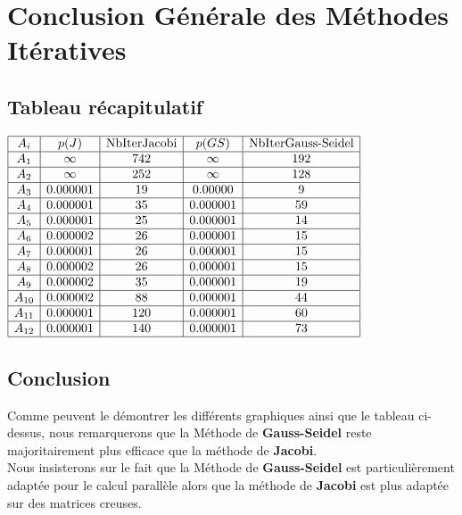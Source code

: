 \documentclass{report}
\begin{document}
\section{Conclusion Générale des Méthodes Itératives}
\subsection{Tableau récapitulatif}
$
\begin{array}{|c|c|c|c|c|}
\hline
A_i & p(J) & \text{NbIterJacobi} & p(GS) & \text{NbIterGauss-Seidel} \\
\hline
A_1 & \infty & 742 & \infty & 192\\
\hline
A_2 & \infty & 252 & \infty & 128 \\
\hline
A_3 & 0.000001& 19 & 0.00000 & 9 \\
\hline
A_4 & 0.000001 & 35 & 0.000001& 59 \\
\hline
A_5 & 0.000001 & 25 & 0.000001& 14 \\
\hline
A_6 & 0.000002 & 26 & 0.000001 & 15 \\
\hline
A_7 & 0.000001 & 26 & 0.000001 & 15 \\
\hline
A_8 & 0.000002 & 26 & 0.000001 & 15 \\
\hline
A_9 & 0.000002 & 35 & 0.000001 & 19 \\ 
\hline
A_{10} & 0.000002 & 88 & 0.000001 & 44 \\
\hline
A_{11} & 0.000001 & 120 & 0.000001& 60 \\
\hline
A_{12} & 0.000001 & 140 & 0.000001 & 73 \\
\hline
\end{array}
$
\subsection{Conclusion}
Comme peuvent le démontrer les différents graphiques ainsi que le tableau ci-dessus, nous remarquerons que la Méthode de \textbf{Gauss-Seidel} reste majoritairement plus efficace que la méthode de \textbf{Jacobi}. \\
Nous insisterons sur le fait que la Méthode de \textbf{Gauss-Seidel} est particulièrement adaptée pour le calcul parallèle alors que la méthode de \textbf{Jacobi} est plus adaptée sur des matrices creuses.
\end{document}
